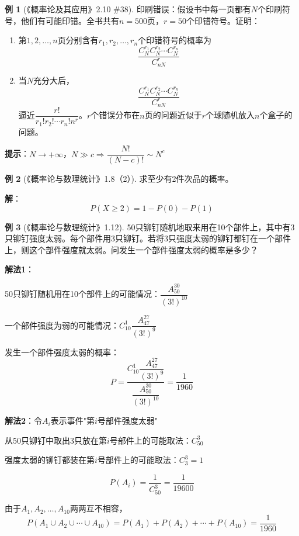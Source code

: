 \documentclass[11pt,a4paper]{report}
\theoremstyle{definition}
\newtheorem{example}{例}[chapter]
\theoremstyle{plain}
\begin{document}
\begin{example}[《概率论及其应用》2.10 \#38]
印刷错误：假设书中每一页都有$N$个印刷符号，他们有可能印错。全书共有$n=500$页，$r=50$个印错符号。证明：
\begin{enumerate}[label=(\alph*)]
    \item 第$1,2,\ldots,n$页分别含有$r_1,r_2,\ldots,r_n$个印错符号的概率为
    \[
    \frac{C_N^{r_1}C_N^{r_2}\cdots C_N^{r_n}}{C_{nN}^r}
    \]
    \item 当$N$充分大后，
    \[
    \frac{C_N^{r_1}C_N^{r_2}\cdots C_N^{r_n}}{C_{nN}^r}
    \]
    逼近$\dfrac{r!}{r_1!r_2!\cdots r_n!n^r}$。$r$个错误分布在$n$页的问题近似于$r$个球随机放入$n$个盒子的问题。
\end{enumerate}

\textbf{提示}：$N\to+\infty$，$N\gg c\Longrightarrow\dfrac{N!}{(N-c)!}\sim N^c$
\end{example}

\begin{example}[《概率论与数理统计》1.8（2）]
求至少有2件次品的概率。

\textbf{解}：
\[
P(X\geq2)=1-P(0)-P(1)
\]
\end{example}

\begin{example}[《概率论与数理统计》1.12]
50只铆钉随机地取来用在10个部件上，其中有3只铆钉强度太弱。每个部件用3只铆钉。若将3只强度太弱的铆钉都钉在一个部件上，则这个部件强度就太弱。问发生一个部件强度太弱的概率是多少？

\textbf{解法1}：

50只铆钉随机用在10个部件上的可能情况：$\dfrac{A_{50}^{30}}{(3!)^{10}}$

一个部件强度为弱的可能情况：$C_{10}^1\dfrac{A_{47}^{27}}{(3!)^9}$

发生一个部件强度太弱的概率：
\[
P=\frac{C_{10}^1\dfrac{A_{47}^{27}}{(3!)^9}}{\dfrac{A_{50}^{30}}{(3!)^{10}}}=\frac{1}{1960}
\]

\textbf{解法2}：令$A_i$表示事件"第$i$号部件强度太弱"

从50只铆钉中取出3只放在第$i$号部件上的可能取法：$C_{50}^3$

强度太弱的铆钉都装在第$i$号部件上的可能取法：$C_3^3=1$

\[
P(A_i)=\frac{1}{C_{50}^3}=\frac{1}{19600}
\]

由于$A_1,A_2,\ldots,A_{10}$两两互不相容，
\[
P(A_1\cup A_2\cup\cdots\cup A_{10})=P(A_1)+P(A_2)+\cdots+P(A_{10})=\frac{1}{1960}
\]
\end{example}
\end{document}
